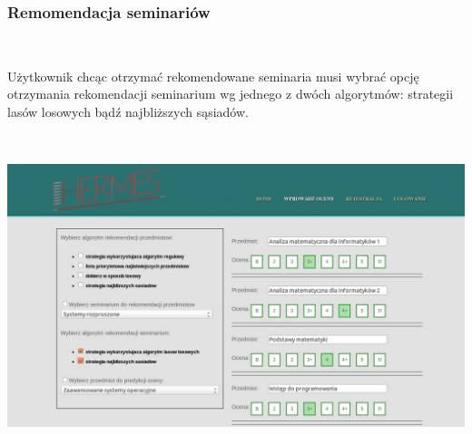 \documentclass[licencjacka]{pracamgr}
\begin{document}
\subsubsection{Remomendacja seminariów}
~\\ \indent

Użytkownik chcąc otrzymać rekomendowane seminaria musi wybrać opcję otrzymania rekomendacji seminarium wg jednego z dwóch algorytmów: strategii lasów losowych bądź najbliższych sąsiadów. \par 
~\\
\begin{minipage}{\linewidth}
	\centering
           \includegraphics[scale=0.5]{reksem.jpg}
\end{minipage} \\

\newpage
\end{document}
